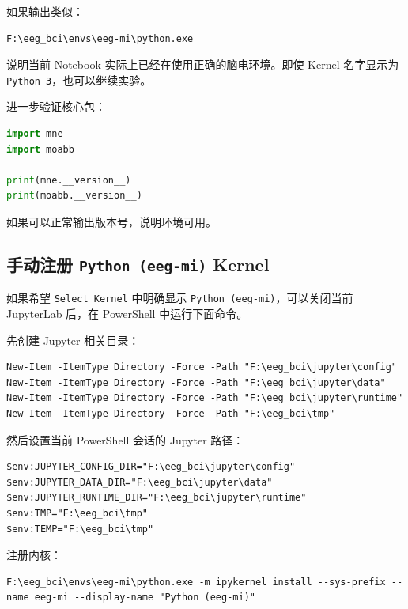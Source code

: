 \documentclass[UTF8,a4paper,12pt]{ctexart}
\begin{document}
如果输出类似：

\begin{lstlisting}[language={}]
F:\eeg_bci\envs\eeg-mi\python.exe
\end{lstlisting}

说明当前 Notebook 实际上已经在使用正确的脑电环境。即使 Kernel 名字显示为 \texttt{Python 3}，也可以继续实验。

进一步验证核心包：

\begin{lstlisting}[language=Python,caption={确认脑电包可用}]
import mne
import moabb

print(mne.__version__)
print(moabb.__version__)
\end{lstlisting}

如果可以正常输出版本号，说明环境可用。

\subsection{手动注册 \texttt{Python (eeg-mi)} Kernel}

如果希望 \texttt{Select Kernel} 中明确显示 \texttt{Python (eeg-mi)}，可以关闭当前 JupyterLab 后，在 PowerShell 中运行下面命令。

先创建 Jupyter 相关目录：

\begin{lstlisting}[language={},caption={创建 Jupyter 配置目录}]
New-Item -ItemType Directory -Force -Path "F:\eeg_bci\jupyter\config"
New-Item -ItemType Directory -Force -Path "F:\eeg_bci\jupyter\data"
New-Item -ItemType Directory -Force -Path "F:\eeg_bci\jupyter\runtime"
New-Item -ItemType Directory -Force -Path "F:\eeg_bci\tmp"
\end{lstlisting}

然后设置当前 PowerShell 会话的 Jupyter 路径：

\begin{lstlisting}[language={},caption={设置 Jupyter 和临时目录到 F 盘}]
$env:JUPYTER_CONFIG_DIR="F:\eeg_bci\jupyter\config"
$env:JUPYTER_DATA_DIR="F:\eeg_bci\jupyter\data"
$env:JUPYTER_RUNTIME_DIR="F:\eeg_bci\jupyter\runtime"
$env:TMP="F:\eeg_bci\tmp"
$env:TEMP="F:\eeg_bci\tmp"
\end{lstlisting}

注册内核：

\begin{lstlisting}[language={},caption={注册 eeg-mi 内核}]
F:\eeg_bci\envs\eeg-mi\python.exe -m ipykernel install --sys-prefix --name eeg-mi --display-name "Python (eeg-mi)"
\end{lstlisting}
\end{document}
